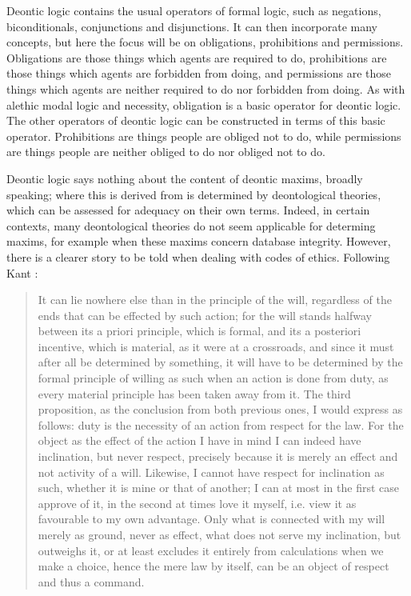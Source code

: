 \documentclass{l4proj}
\begin{document}
Deontic logic contains the usual operators of formal logic, such as negations, biconditionals, 
conjunctions and disjunctions. It can then incorporate many concepts, but here the focus will be on obligations, prohibitions and permissions. Obligations are those things which agents are required to do, prohibitions are those things which agents are forbidden from doing, and permissions are those things which agents are neither required to do nor forbidden from doing. As with alethic modal logic and necessity, obligation is a basic operator for deontic logic. The other operators of deontic logic can be constructed in terms of this basic operator. Prohibitions are things people are obliged not to do, while permissions are things people are neither obliged to do nor obliged not to do. 

Deontic logic says nothing about the content of deontic maxims, broadly speaking; where this is derived from is determined by deontological theories, which can be assessed for adequacy on their own terms. Indeed, in certain contexts, many deontological theories do not seem applicable for determing maxims, for example when these maxims concern database integrity. However, there is a clearer story to be told when dealing with codes of ethics. Following Kant \cite{groundwork}: 

\blockquote{It can lie nowhere else than in the principle of the will, regardless of the ends that can be effected by such action; for the will stands halfway between its a priori principle, which is formal, and its a posteriori incentive, which is material, as it were at a crossroads, and since it must after all be determined by something, it will have to be determined by the formal principle of willing as such when an action is done from duty, as every material principle has been taken away from it. The third proposition, as the conclusion from both previous ones, I would express as follows: duty is the necessity of an action from respect for the law. For the object as the effect of the action I have in mind I can indeed have inclination, but never respect, precisely because it is merely an effect and not activity of a will. Likewise, I cannot have respect for inclination as such, whether it is mine or that of another; I can at most in the first case approve of it, in the second at times love it myself, i.e. view it as favourable to my own advantage. Only what is connected with my will merely as ground, never as effect, what does not serve my inclination, but outweighs it, or at least excludes it entirely from calculations when we make a choice, hence the mere law by itself, can be an object of respect and thus a command.}
\end{document}
